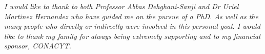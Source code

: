 

\begin{acknowledgements}      %

\setlength{\parindent}{17.62482pt}
\setlength{\parskip}{0.0pt plus 1.0pt}

\textit{I would like to thank to both Professor Abbas Dehghani-Sanji and Dr Uriel Martinez Hernandez who have guided me on the pursue of a PhD. As well as the many people who directly or indirectly were involved in this personal goal. I would like to thank my family for always being extremely supporting and to my financial sponsor, CONACYT.}

\end{acknowledgements}


